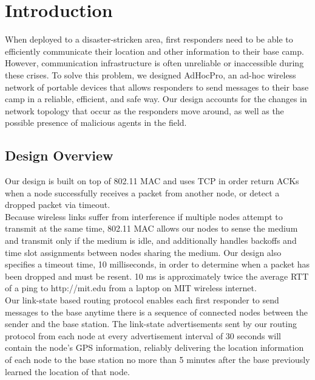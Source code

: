\documentclass[letterpaper]{article}
\begin{document}
\section{Introduction}

When deployed to a disaster-stricken area, first responders need to be able to efficiently communicate their
location and other information to their base camp. However, communication infrastructure is often unreliable
or inaccessible during these crises. To solve this problem, we designed AdHocPro, an ad-hoc wireless network of
portable devices that allows responders to send messages to their base camp in a reliable, efficient, and safe
way. Our design accounts for the changes in network topology that occur as the responders move 
around, as well as the possible presence of malicious agents in the field. 

\subsection{Design Overview}

Our design is built on top of 802.11 MAC and uses TCP in order return ACKs when a node successfully receives
a packet from another node, or detect a dropped packet via timeout.
\\

\noindent Because wireless links suffer from interference if multiple nodes attempt to transmit at the same time,
802.11 MAC allows our nodes to sense the medium and transmit only if the medium is idle, and additionally handles
backoffs and time slot assignments between nodes sharing the medium. Our design also specifies a timeout time, 
10 milliseconds, in order to determine when a packet has been dropped and must be resent. 10 ms is approximately 
twice the average RTT of a ping to http://mit.edu from a laptop on MIT wireless internet.
\\

\noindent Our link-state based routing protocol enables each first responder to send messages to the base anytime
there is a sequence of connected nodes between the sender and the base station. The link-state advertisements 
sent by our routing protocol from each node at every advertisement interval of 30 seconds will contain the node's
GPS  information, reliably delivering the location information of each node to the base station no more than
5 minutes after the base previously learned the location of that node.
\\
\end{document}
